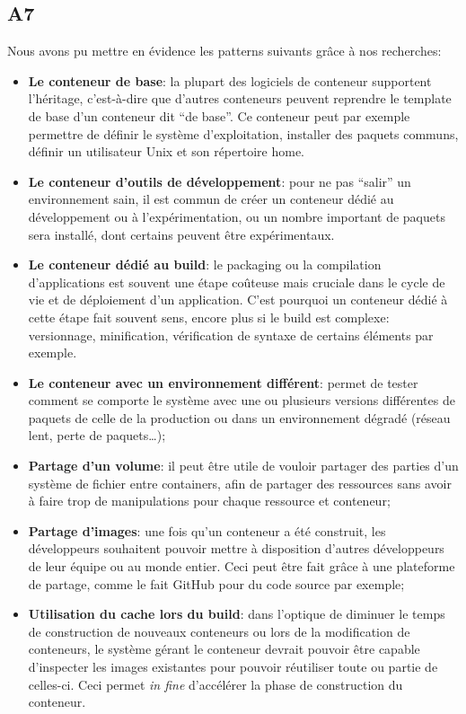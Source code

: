 \subsection{A7}
    Nous avons pu mettre en évidence les patterns suivants grâce à nos recherches\cite{dzone}\cite{hokstad}:
    \begin{itemize}
        \item \textbf{Le conteneur de base}: la plupart des logiciels de conteneur supportent l'héritage, c'est-à-dire que d'autres conteneurs peuvent reprendre le template de base d'un conteneur dit \enquote{de base}. Ce conteneur peut par exemple permettre de définir le système d'exploitation, installer des paquets communs, définir un utilisateur Unix et son répertoire home.
        \item \textbf{Le conteneur d'outils de développement}: pour ne pas \enquote{salir} un environnement sain, il est commun de créer un conteneur dédié au développement ou à l'expérimentation, ou un nombre important de paquets sera installé, dont certains peuvent être expérimentaux.
        \item \textbf{Le conteneur dédié au build}: le packaging ou la compilation d'applications est souvent une étape coûteuse mais cruciale dans le cycle de vie et de déploiement d'un application. C'est pourquoi un conteneur dédié à cette étape fait souvent sens, encore plus si le build est complexe: versionnage, minification, vérification de syntaxe de certains éléments par exemple.
        \item \textbf{Le conteneur avec un environnement différent}: permet de tester comment se comporte le système avec une ou plusieurs versions différentes de paquets de celle de la production ou dans un environnement dégradé (réseau lent, perte de paquets\dots);
        \item \textbf{Partage d'un volume}: il peut être utile de vouloir partager des parties d'un système de fichier entre containers, afin de partager des ressources sans avoir à faire trop de manipulations pour chaque ressource et conteneur;
        \item \textbf{Partage d'images}: une fois qu'un conteneur a été construit, les développeurs souhaitent pouvoir mettre à disposition d'autres développeurs de leur équipe ou au monde entier. Ceci peut être fait grâce à une plateforme de partage, comme le fait GitHub pour du code source par exemple;
        \item \textbf{Utilisation du cache lors du build}: dans l'optique de diminuer le temps de construction de nouveaux conteneurs ou lors de la modification de conteneurs, le système gérant le conteneur devrait pouvoir être capable d'inspecter les images existantes pour pouvoir réutiliser toute ou partie de celles-ci. Ceci permet \textit{in fine} d'accélérer la phase de construction du conteneur.
    \end{itemize}
